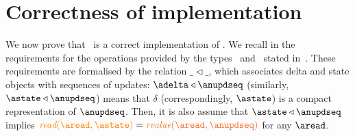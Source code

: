 
\section{Correctness of implementation}
\label{sec:simulation}

We now prove that  \igsp\ is a correct implementation 
of \gsp. We recall in  the requirements for the
operations provided by the  types 
\statetype\ and \deltatype\ stated in~\cite{}. 
These requirements are formalised by the relation $\_\triangleleft \_$, which associates 
 delta and state objects with sequences of updates: $\adelta\triangleleft\anupdseq$
 (similarly, $\astate\triangleleft\anupdseq$)  means  that $\delta$ (correspondingly, $\astate$) 
 is a compact representation of $\anupdseq$. Then, it is also assume that 
$\astate\triangleleft\anupdseq$ implies  $\iread \aread \astate  = \rvalue \aread  \anupdseq$ for any $\aread$.

